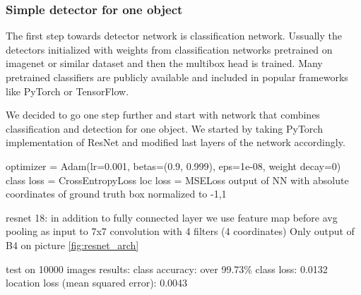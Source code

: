 


\subsubsection{Simple detector for one object}
The first step towards detector network is classification network. Ussually the detectors initialized with weights from classification networks pretrained on imagenet or similar dataset and then the multibox head is trained. Many pretrained classifiers are publicly available and included in popular frameworks like PyTorch or TensorFlow.

We decided  to go one step further and start with network that combines classification and detection for one object. We started by taking PyTorch implementation of ResNet and modified last layers of the network accordingly. 


optimizer = Adam(lr=0.001, betas=(0.9, 0.999), eps=1e-08, weight decay=0)
class loss = CrossEntropyLoss
loc loss = MSELoss output of NN with absolute coordinates of ground truth box normalized to -1,1 

resnet 18: in addition to fully connected layer we use feature map before avg pooling as input to 7x7 convolution with 4 filters (4 coordinates) Only output of B4 on picture \cref{fig:resnet_arch} 

test on 10000 images
results: class accuracy: over 99.73\%
class loss: 0.0132
location loss (mean squared error): 0.0043



